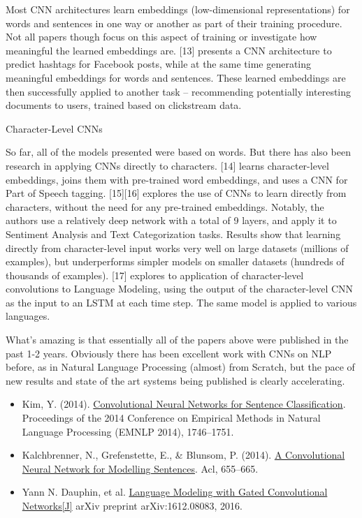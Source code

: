 \documentclass[10pt,a4paper]{ctexbook}
\begin{document}
Most CNN architectures learn embeddings (low-dimensional representations) for words and sentences in one way or another as part of their training procedure. Not all papers though focus on this aspect of training or investigate how meaningful the learned embeddings are. [13] presents a CNN architecture to predict hashtags for Facebook posts, while at the same time generating meaningful embeddings for words and sentences. These learned embeddings are then successfully applied to another task – recommending potentially interesting documents to users, trained based on clickstream data.

Character-Level CNNs

So far, all of the models presented were based on words. But there has also been research in applying CNNs directly to characters. [14] learns character-level embeddings, joins them with pre-trained word embeddings, and uses a CNN for Part of Speech tagging. [15][16] explores the use of CNNs to learn directly from characters, without the need for any pre-trained embeddings. Notably, the authors use a relatively deep network with a total of 9 layers, and apply it to Sentiment Analysis and Text Categorization tasks. Results show that learning directly from character-level input works very well on large datasets (millions of examples), but underperforms simpler models on smaller datasets (hundreds of thousands of examples). [17] explores to application of character-level convolutions to Language Modeling, using the output of the character-level CNN as the input to an LSTM at each time step. The same model is applied to various languages.

What's amazing is that essentially all of the papers above were published in the past 1-2 years. Obviously there has been excellent work with CNNs on NLP before, as in Natural Language Processing (almost) from Scratch, but the pace of new results and state of the art systems being published is clearly accelerating.

\begin{itemize}
\item Kim, Y. (2014). \href{http://arxiv.org/pdf/1408.5882}{Convolutional Neural Networks for Sentence Classification}. Proceedings of the 2014 Conference on Empirical Methods in Natural Language Processing (EMNLP 2014), 1746–1751.
\item Kalchbrenner, N., Grefenstette, E., \& Blunsom, P. (2014). \href{http://arxiv.org/pdf/1404.2188.pdf}{A Convolutional Neural Network for Modelling Sentences}. Acl, 655–665.
\item Yann N. Dauphin, et al. \href{https://arxiv.org/pdf/1612.08083v1.pdf}{Language Modeling with Gated Convolutional Networks[J]} arXiv preprint arXiv:1612.08083, 2016.
\end{itemize}
\end{document}
